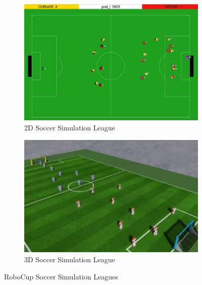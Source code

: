 \begin{figure}
  \centering
  \begin{subfigure}[b]{0.48\textwidth}
    \includegraphics[width=\textwidth]{pics/soccer_simulation_2d}
    \caption{2D Soccer Simulation League~\cite{soccer_simulation_2d_pic}}
    \label{fig:soccer_simulation_2d}
  \end{subfigure}
  \begin{subfigure}[b]{0.48\textwidth}
    \includegraphics[width=\textwidth]{pics/soccer_simulation_3d}
    \caption{3D Soccer Simulation League~\cite{soccer_simulation_low_level}}
    \label{fig:soccer_simulation_3d}
  \end{subfigure}
  \caption{RoboCup Soccer Simulation Leagues}
  \label{fig:soccer_simulation}
\end{figure}
